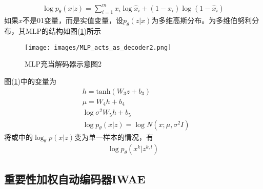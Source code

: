             \begin{align*}
            \log p_\theta(x|z) = \sum_{i=1}^m x_i \log \hat{x}_i + (1-\hat{x}_i)\log (1-\hat{x}_i)
            \end{align*}
            如果$x$不是01变量，而是实值变量，设$p_\theta(z|x)$为多维高斯分布。为多维伯努利分布，其MLP的结构如图(\ref{fig:MLP充当解码器示意图2})所示
            \begin{figure}[H]
            \centering
            \texttt{[image: images/MLP\_acts\_as\_decoder2.png]}
            \caption{MLP充当解码器示意图2}
            \label{fig:MLP充当解码器示意图2}
            \end{figure}
            图(\ref{fig:MLP充当解码器示意图2})中的变量为
            \begin{align*}
            & h=\mathrm{tanh}(W_3z+b_3)\\
            & \mu=W_4h+b_4\\
            & \log \sigma^2 W_5h+b_5\\
            & \log p_\theta (x|z) = \log N(x;\mu,\sigma^2I)
            \end{align*}
            将或中的$\log_\theta p(x|z)$变为单一样本的情况，有
            \begin{align*}
            \log p_\theta (x^k|z^{k,l})
            \end{align*}
    \subsection{重要性加权自动编码器IWAE}
